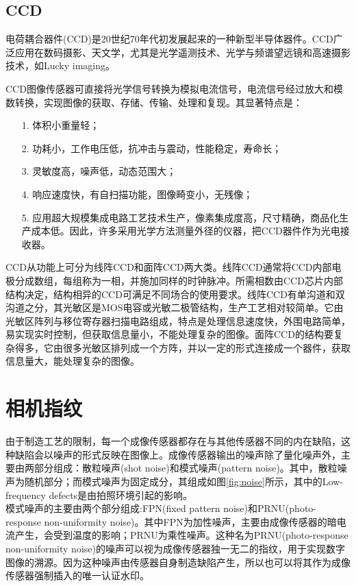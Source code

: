 \documentclass[a4paper,11pt]{article}
\begin{document}
 \subsection{CCD}
电荷耦合器件(CCD)是20世纪70年代初发展起来的一种新型半导体器件。CCD广泛应用在数码摄影、天文学，尤其是光学遥测技术、光学与频谱望远镜和高速摄影技术，如Lucky imaging。

CCD图像传感器可直接将光学信号转换为模拟电流信号，电流信号经过放大和模数转换，实现图像的获取、存储、传输、处理和复现。其显著特点是：
\begin{itemize}
\item[1.] 体积小重量轻；
\item[2.] 功耗小，工作电压低，抗冲击与震动，性能稳定，寿命长；
\item[3.] 灵敏度高，噪声低，动态范围大；
\item [4.]响应速度快，有自扫描功能，图像畸变小，无残像；
\item [5.]应用超大规模集成电路工艺技术生产，像素集成度高，尺寸精确，商品化生产成本低。因此，许多采用光学方法测量外径的仪器，把CCD器件作为光电接收器。
\end{itemize}

CCD从功能上可分为线阵CCD和面阵CCD两大类。线阵CCD通常将CCD内部电极分成数组，每组称为一相，并施加同样的时钟脉冲。所需相数由CCD芯片内部结构决定，结构相异的CCD可满足不同场合的使用要求。线阵CCD有单沟道和双沟道之分，其光敏区是MOS电容或光敏二极管结构，生产工艺相对较简单。它由光敏区阵列与移位寄存器扫描电路组成，特点是处理信息速度快，外围电路简单，易实现实时控制，但获取信息量小，不能处理复杂的图像。面阵CCD的结构要复杂得多，它由很多光敏区排列成一个方阵，并以一定的形式连接成一个器件，获取信息量大，能处理复杂的图像。

\section{相机指纹}
由于制造工艺的限制，每一个成像传感器都存在与其他传感器不同的内在缺陷，这种缺陷会以噪声的形式反映在图像上。成像传感器输出的噪声除了量化噪声外，主要由两部分组成：散粒噪声(shot noise)和模式噪声(pattern noise)。其中，散粒噪声为随机部分；而模式噪声为固定成分，其组成如图\ref{fig:noise}所示，其中的Low-frequency defects是由拍照环境引起的影响。
\\

模式噪声的主要由两个部分组成:FPN(fixed pattern noise)和PRNU(photo-response non-uniformity noise)。其中FPN为加性噪声，主要由成像传感器的暗电流产生，会受到温度的影响；PRNU为乘性噪声。这种名为PRNU(photo-response non-uniformity noise)的噪声可以视为成像传感器独一无二的指纹，用于实现数字图像的溯源。因为这种噪声由传感器自身制造缺陷产生，所以也可以将其作为成像传感器强制插入的唯一认证水印。
\end{document}
